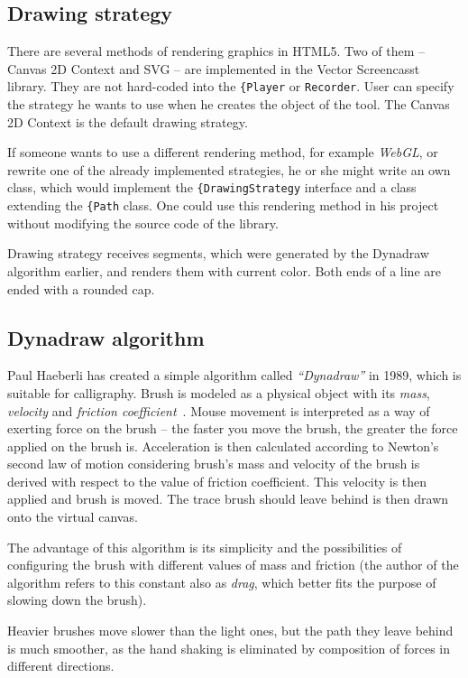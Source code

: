 \subsection{Drawing strategy}
There are several methods of rendering graphics in HTML5. Two of them -- Canvas 2D Context and SVG -- are implemented in the Vector Screencasst library. They are not hard-coded into the \verb|{Player| or \verb|Recorder|. User can specify the strategy he wants to use when he creates the object of the tool. The Canvas 2D Context is the default drawing strategy.

If someone wants to use a different rendering method, for example \textit{WebGL}, or rewrite one of the already implemented strategies, he or she might write an own class, which would implement the \verb|{DrawingStrategy| interface and a class extending the \verb|{Path| class. One could use this rendering method in his project without modifying the source code of the library.

Drawing strategy receives segments, which were generated by the Dynadraw algorithm earlier, and renders them with current color. Both ends of a line are ended with a rounded cap.


\subsection{Dynadraw algorithm}
\label{sec:dynadraw}

Paul Haeberli has created a simple algorithm called \textit{``Dynadraw''} in 1989, which is suitable for calligraphy. Brush is modeled as a physical object with its \textit{mass}, \textit{velocity} and \textit{friction coefficient}~\cite{dynadraw}. Mouse movement is interpreted as a way of exerting force on the brush -- the faster you move the brush, the greater the force applied on the brush is. Acceleration is then calculated according to Newton's second law of motion considering brush's mass and velocity of the brush is derived with respect to the value of friction coefficient. This velocity is then applied and brush is moved. The trace brush should leave behind is then drawn onto the virtual canvas.

The advantage of this algorithm is its simplicity and the possibilities of configuring the brush with different values of mass and friction (the author of the algorithm refers to this constant also as \textit{drag}, which better fits the purpose of slowing down the brush).

Heavier brushes move slower than the light ones, but the path they leave behind is much smoother, as the hand shaking is eliminated by composition of forces in different directions.


